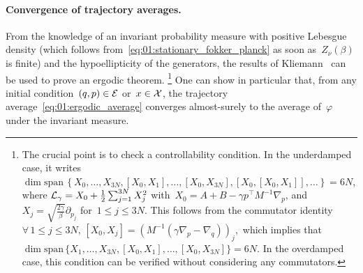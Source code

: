 \paragraph{Convergence of trajectory averages.}
From the knowledge of an invariant probability measure with positive Lebesgue density (which follows from~\eqref{eq:01:stationary_fokker_planck} as soon as~$Z_\nu(\beta)$ is finite) and the hypoellipticity of the generators, the results of Kliemann~\cite{K87} can be used to prove an ergodic theorem.
\footnote{The crucial point is to check a controllability condition. In the underdamped case, it writes~$\dim\mathrm{span}\,\left\{X_0,\dots,X_{3N},[X_0,X_1],\dots,[X_0,X_{3N}],[X_0,[X_0,X_1]],\dots\right\} = 6N$, where $\mathcal{L}_\gamma = X_0 + \frac12\sum_{j=1}^{3N}X_j^2$ with~$X_0=A+B-\gamma p^\top M^{-1}\nabla_p$, and $X_j=\sqrt{\frac{2\gamma}{\beta}}\partial_{p_j}$ for~$1\leq j\leq 3N$. This follows from the commutator identity $\forall\,1\leq j\leq 3N,\,[X_0,X_j] = \left(M^{-1}(\gamma\nabla_p-\nabla_q)\right)_j,$
which implies that~$\dim\mathrm{span}\,\{X_1,\dots,X_{3N},[X_0,X_1],\dots,[X_0,X_{3N}]\}=6N$. In the overdamped case, this condition can be verified without considering any commutators.}
One can show in particular that, from any initial condition~$(q,p)\in\mathcal{E}$ or~$x\in\mathcal{X}$, the trajectory average~\eqref{eq:01:ergodic_average} converges almost-surely to the average of~$\varphi$ under the invariant measure.

